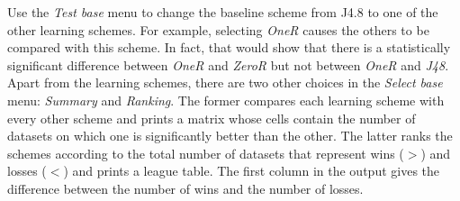Use the \textit{Test base} menu to change the baseline scheme from
J4.8 to one of the other learning schemes. For example, selecting
\textit{OneR} causes the others to be compared with this scheme. In
fact, that would show that there is a statistically significant
difference between \textit{OneR} and \textit{ZeroR} but not between
\textit{OneR} and \textit{J48}. Apart from the learning schemes, there
are two other choices in the \textit{Select base} menu:
\textit{Summary} and \textit{Ranking}. The former compares each
learning scheme with every other scheme and prints a matrix whose
cells contain the number of datasets on which one is significantly
better than the other. The latter ranks the schemes according to the
total number of datasets that represent wins ($>$) and losses ($<$) and
prints a league table. The first column in the output gives the
difference between the number of wins and the number of losses.

